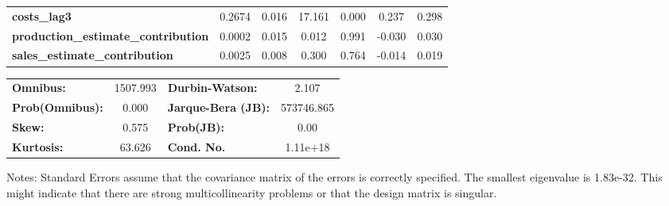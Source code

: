 \begin{center}
\begin{tabular}{lcccccc}
\textbf{costs\_lag3}                        &       0.2674  &        0.016     &    17.161  &         0.000        &        0.237    &        0.298     \\
\textbf{production\_estimate\_contribution} &       0.0002  &        0.015     &     0.012  &         0.991        &       -0.030    &        0.030     \\
\textbf{sales\_estimate\_contribution}      &       0.0025  &        0.008     &     0.300  &         0.764        &       -0.014    &        0.019     \\
\bottomrule
\end{tabular}
\begin{tabular}{lclc}
\textbf{Omnibus:}       & 1507.993 & \textbf{  Durbin-Watson:     } &     2.107   \\
\textbf{Prob(Omnibus):} &   0.000  & \textbf{  Jarque-Bera (JB):  } & 573746.865  \\
\textbf{Skew:}          &   0.575  & \textbf{  Prob(JB):          } &      0.00   \\
\textbf{Kurtosis:}      &  63.626  & \textbf{  Cond. No.          } &  1.11e+18   \\
\bottomrule
\end{tabular}
\end{center}

Notes: \newline
 [1] Standard Errors assume that the covariance matrix of the errors is correctly specified. \newline
 [2] The smallest eigenvalue is 1.83e-32. This might indicate that there are \newline
 strong multicollinearity problems or that the design matrix is singular.